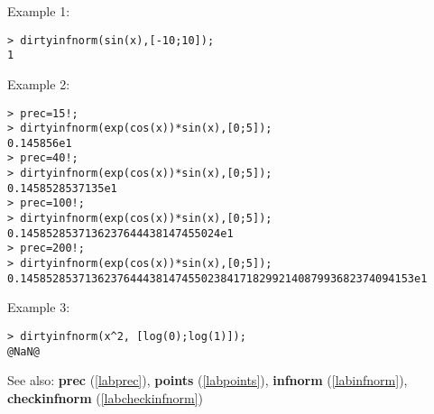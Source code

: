 \noindent Example 1: 
\begin{center}\begin{minipage}{15cm}\begin{Verbatim}[frame=single]
> dirtyinfnorm(sin(x),[-10;10]);
1
\end{Verbatim}
\end{minipage}\end{center}
\noindent Example 2: 
\begin{center}\begin{minipage}{15cm}\begin{Verbatim}[frame=single]
> prec=15!;
> dirtyinfnorm(exp(cos(x))*sin(x),[0;5]);
0.145856e1
> prec=40!;
> dirtyinfnorm(exp(cos(x))*sin(x),[0;5]);
0.1458528537135e1
> prec=100!;
> dirtyinfnorm(exp(cos(x))*sin(x),[0;5]);
0.1458528537136237644438147455024e1
> prec=200!;
> dirtyinfnorm(exp(cos(x))*sin(x),[0;5]);
0.1458528537136237644438147455023841718299214087993682374094153e1
\end{Verbatim}
\end{minipage}\end{center}
\noindent Example 3: 
\begin{center}\begin{minipage}{15cm}\begin{Verbatim}[frame=single]
> dirtyinfnorm(x^2, [log(0);log(1)]);
@NaN@
\end{Verbatim}
\end{minipage}\end{center}
See also: \textbf{prec} (\ref{labprec}), \textbf{points} (\ref{labpoints}), \textbf{infnorm} (\ref{labinfnorm}), \textbf{checkinfnorm} (\ref{labcheckinfnorm})
